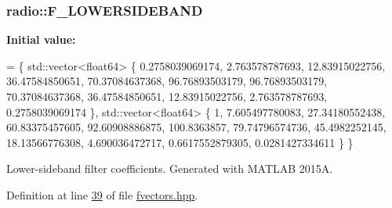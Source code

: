 \hypertarget{namespaceradio_a0ffd57d5a11ff70a1f55dbdc8ebe098d}{
\subsubsection[{F\+\_\+\+L\+O\+W\+E\+R\+S\+I\+D\+E\+B\+A\+N\+D}]{ radio\+::\+F\+\_\+\+L\+O\+W\+E\+R\+S\+I\+D\+E\+B\+A\+N\+D}}\label{namespaceradio_a0ffd57d5a11ff70a1f55dbdc8ebe098d}
{\bfseries Initial value\+:}
\begin{DoxyCode}
= \{ std::vector<float64> \{
        0.2758039069174,   
            2.763578787693,   
            12.83915022756,   
            36.47584850651,
            70.37084637368,   
            96.76893503179,   
            96.76893503179,   
            70.37084637368,
            36.47584850651,   
            12.83915022756,   
            2.763578787693,  
            0.2758039069174   
    \}, std::vector<float64> \{
        1,
            7.605497780083,   
            27.34180552438,   
            60.83375457605,
            92.60908886875,       
            100.8363857,    
            79.74796574736,     
            45.4982252145,
            18.13566776308,    
            4.690036472717,   
            0.6617552879305,   
            0.0281427334611
    \} \}
\end{DoxyCode}
Lower-\/sideband filter coefficients. Generated with M\+A\+T\+L\+A\+B 2015\+A. 

Definition at line \hyperlink{fvectors_8hpp_source_l00039}{39} of file \hyperlink{fvectors_8hpp_source}{fvectors.\+hpp}.

